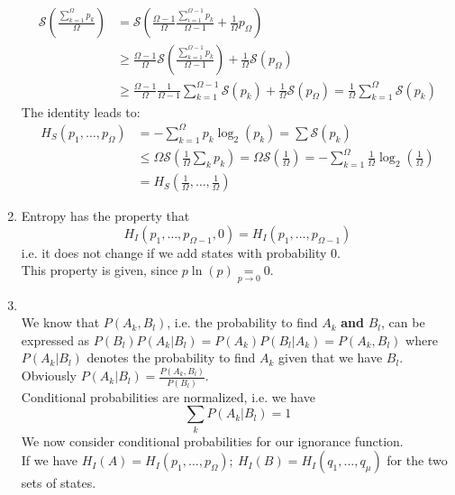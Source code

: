 \begin{enumerate}[label={$(\arabic*)$}]
\begin{align*}
\mathcal{S}\left(\frac{\sum\limits_{k=1}^\Omega p_k}{\Omega}\right)&=\mathcal{S}\left(\frac{\Omega -1}{\Omega}\frac{\sum\limits_{i=1}^{\Omega -1}p_k}{\Omega -1}+\frac{1}{\Omega}p_\Omega\right)\\
&\geq \frac{\Omega -1}{\Omega}\mathcal{S}\left(\frac{\sum\limits_{k=1}^{\Omega -1} p_k}{\Omega -1}\right)+\frac{1}{\Omega}\mathcal{S}(p_\Omega)\\
&\geq \frac{\Omega -1}{\Omega}\frac{1}{\Omega -1}\sum\limits_{k=1}^{\Omega -1}\mathcal{S}(p_k)+\frac{1}{\Omega}\mathcal{S}(p_\Omega)=\frac{1}{\Omega}\sum\limits_{k=1}^\Omega\mathcal{S}(p_k)
\end{align*}
The identity leads to:
\begin{align*}
H_S(p_1,\ldots,p_\Omega)&=-\sum\limits_{k=1}^\Omega p_k\log_2(p_k)=\sum\mathcal{S}(p_k)\\
&\leq\Omega\mathcal{S}\left(\frac{1}{\Omega}\sum\limits_kp_k\right)=\Omega\mathcal{S}\left(\frac{1}{\Omega}\right)=-\sum\limits_{k=1}^\Omega\frac{1}{\Omega}\log_2\left(\frac{1}{\Omega}\right)\\
&=H_S\left(\frac{1}{\Omega},\ldots,\frac{1}{\Omega}\right)
\end{align*}
\item Entropy has the property that
\begin{equation*}
H_I(p_1,\ldots,p_{\Omega -1},0)=H_I(p_1,\ldots,p_{\Omega-1})
\end{equation*}
i.e. it does not change if we add states with probability 0.\\
This property is given, since $p\ln(p)\underset{p\to 0}{=}0$.
\item \underline{}\\
We know that $P(A_k,B_l)$, i.e. the probability to find $A_k$ \textbf{and} $B_l$, can be expressed as $P(B_l)P(A_k|B_l)=P(A_k)P(B_l|A_k)=P(A_k,B_l)$ where $P(A_k|B_l)$ denotes the probability to find $A_k$ given that we have $B_l$. Obviously $P(A_k|B_l)=\frac{P(A_k,B_l)}{P(B_l)}$.\\
Conditional probabilities are normalized, i.e. we have
\begin{equation*}
\sum\limits_k P(A_k|B_l)=1
\end{equation*}
We now consider conditional probabilities for our ignorance function.\\
If we have $H_I(A)=H_I(p_1,\ldots,p_\Omega);\ H_I(B)=H_I(q_1,\ldots,q_\mu)$ for the two sets of states.\\

\end{enumerate}
